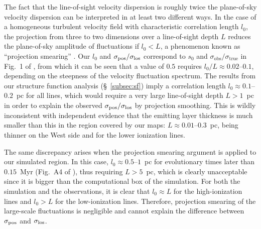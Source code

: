 \documentclass[useAMS,usenatbib]{mn2e}
\begin{document}
The fact that the line-of-sight velocity dispersion is roughly twice
the plane-of-sky velocity dispersion can be interpreted in at least
two different ways.  In the case of a homogeneous turbulent velocity
field with characteristic correlation length \(l_0\), the projection
from three to two dimensions over a line-of-sight depth \(L\) reduces
the plane-of-sky amplitude of fluctuations if \(l_0 < L\), a
phenomenon known as ``projection smearing'' \citep{von-Hoerner:1951a,
  Scalo:1984a}.  Our \(l_0\) and \(\sigma_{\mathrm{pos}} / \sigma_{\mathrm{los}}\)
correspond to \(s_0\) and
\(\sigma_{\mathrm{obs}} / \sigma_{\mathrm{true}}\) in Fig.~1 of
\citet{Scalo:1984a}, from which it can be seen that a value of \(0.5\)
requires \(l_0 / L \approx 0.02\)--\(0.1\), depending on the steepness
of the velocity fluctuation spectrum.  The results from our structure
function analysis (\S~\ref{subsec:sf}) imply a correlation length
\(l_0 \approx 0.1\)--\(0.2\)~pc for all lines, which would require a
very large line-of-sight depth \(L > 1\)~pc in order to explain the
observed \(\sigma_{\mathrm{pos}} / \sigma_{\mathrm{los}}\) by projection smoothing.  This is
wildly inconsistent with independent evidence \citep{Baldwin:1991a,
  ODell:2001b, Garcia-Diaz:2007a} that the emitting layer thickness is
much smaller than this in the region covered by our maps:
\(L \approx 0.01\)--\(0.3\)~pc, being thinner on the West side and for
the lower ionization lines.

The same discrepancy arises when the projection smearing argument is
applied to our simulated \hii{} region.  In this case,
\(l_0 \approx 0.5\)--\(1\)~pc for evolutionary times later than
\(0.15\)~Myr (Fig.~A4 of \citealp{Medina:2014a}), thus requiring
\(L > 5\)~pc, which is clearly unacceptable since it is bigger than the
computational box of the simulation.  For both the simulation and the
observations, it is clear that \(l_0 \approx L\) for the
high-ionization lines and \(l_0 > L\) for the low-ionization lines.
Therefore, projection smearing of the large-scale fluctuations is
negligible and cannot explain the difference between \(\sigma_{\mathrm{pos}}\)
and \(\sigma_{\mathrm{los}}\). 
\end{document}

